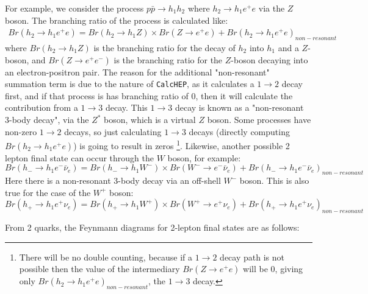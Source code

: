 \documentclass[12pt]{article}
\begin{document}
For example, we consider the process $p\bar{p} \rightarrow h_1h_2$ where $ h_2\rightarrow h_1 e^+e$ via the $Z$ boson. The branching ratio of the process is calculated like:
\begin{equation}
    \begin{split}
        Br(h_2 \rightarrow h_1 e^+e) = Br(h_2\rightarrow h_1Z) \times Br(Z\rightarrow e^+e) + Br(h_2 \rightarrow h_1 e^+e)_{non-resonant}
    \end{split}
\end{equation}
where \( Br(h_2 \rightarrow h_1 Z) \) is the branching ratio for the decay of \( h_2 \) into \( h_1 \) and a \( Z \)-boson, and \( Br(Z \rightarrow e^+ e^-) \) is the branching ratio for the \( Z \)-boson decaying into an electron-positron pair. The reason for the additional "non-resonant" summation term is due to the nature of \verb|CalcHEP|, as it calculates a $1\rightarrow2$ decay first, and if that process is has branching ratio of $0$, then it will calculate the contribution from a $1\rightarrow3$ decay.  This  $1\rightarrow3$ decay is known as a "non-resonant 3-body decay", via the $Z^*$ boson, which is a virtual $Z$ boson. Some processes have non-zero $1\rightarrow2$ decays, so just calculating $1\rightarrow3$ decays (directly computing $Br(h_2 \rightarrow h_1 e^+e)$) is going to result in zeros \footnote{There will be no double counting, because if a $1\rightarrow2$ decay path is not possible then the value of the intermediary $Br(Z\rightarrow e^+e)$ will be $0$, giving only $Br(h_2 \rightarrow h_1 e^+e)_{non-resonant}$, the $1\rightarrow3$ decay.}. Likewise, another possible 2 lepton final state can occur through the $W$ boson, for example:
\begin{equation}
    Br(h_-\rightarrow h_1e^- \bar{\nu}_e) = Br(h_-\rightarrow h_1 W^-) \times Br(W^- \rightarrow e^- \bar{\nu}_e) + Br(h_-\rightarrow h_1e^- \bar{\nu}_e)_{non-resonant}
\end{equation}
Here there is a non-resonant 3-body decay via an off-shell ${W^-}$ boson. This is also true for the case of the $W^+$ boson:
\begin{equation}
    Br(h_+\rightarrow h_1e^+ \nu_e) = Br(h_+\rightarrow h_1 W^+) \times Br(W^+ \rightarrow e^+ \nu_e) + Br(h_+\rightarrow h_1e^+ \nu_e)_{non-resonant}
\end{equation}

From 2 quarks, the Feynmann diagrams for 2-lepton final states are as follows:
\end{document}
